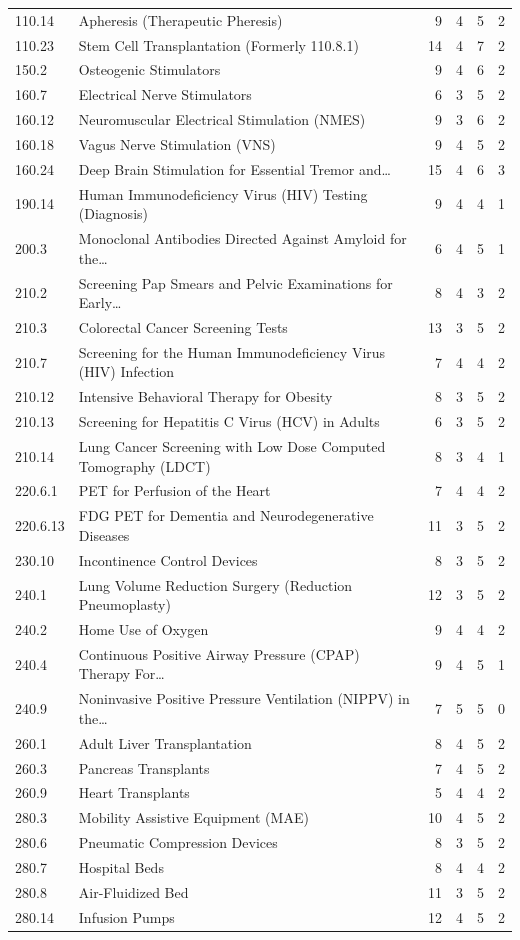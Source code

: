 \documentclass[11pt]{article}
\begin{document}
\begin{longtable}{llrrrr}
110.14 & Apheresis (Therapeutic Pheresis) & 9 & 4 & 5 & 2 \\
110.23 & Stem Cell Transplantation (Formerly 110.8.1) & 14 & 4 & 7 & 2 \\
150.2 & Osteogenic Stimulators & 9 & 4 & 6 & 2 \\
160.7 & Electrical Nerve Stimulators & 6 & 3 & 5 & 2 \\
160.12 & Neuromuscular Electrical Stimulation (NMES) & 9 & 3 & 6 & 2 \\
160.18 & Vagus Nerve Stimulation (VNS) & 9 & 4 & 5 & 2 \\
160.24 & Deep Brain Stimulation for Essential Tremor and\ldots & 15 & 4 & 6 & 3 \\
190.14 & Human Immunodeficiency Virus (HIV) Testing (Diagnosis) & 9 & 4 & 4 & 1 \\
200.3 & Monoclonal Antibodies Directed Against Amyloid for the\ldots & 6 & 4 & 5 & 1 \\
210.2 & Screening Pap Smears and Pelvic Examinations for Early\ldots & 8 & 4 & 3 & 2 \\
210.3 & Colorectal Cancer Screening Tests & 13 & 3 & 5 & 2 \\
210.7 & Screening for the Human Immunodeficiency Virus (HIV) Infection & 7 & 4 & 4 & 2 \\
210.12 & Intensive Behavioral Therapy for Obesity & 8 & 3 & 5 & 2 \\
210.13 & Screening for Hepatitis C Virus (HCV) in Adults & 6 & 3 & 5 & 2 \\
210.14 & Lung Cancer Screening with Low Dose Computed Tomography (LDCT) & 8 & 3 & 4 & 1 \\
220.6.1 & PET for Perfusion of the Heart & 7 & 4 & 4 & 2 \\
220.6.13 & FDG PET for Dementia and Neurodegenerative Diseases & 11 & 3 & 5 & 2 \\
230.10 & Incontinence Control Devices & 8 & 3 & 5 & 2 \\
240.1 & Lung Volume Reduction Surgery (Reduction Pneumoplasty) & 12 & 3 & 5 & 2 \\
240.2 & Home Use of Oxygen & 9 & 4 & 4 & 2 \\
240.4 & Continuous Positive Airway Pressure (CPAP) Therapy For\ldots & 9 & 4 & 5 & 1 \\
240.9 & Noninvasive Positive Pressure Ventilation (NIPPV) in the\ldots & 7 & 5 & 5 & 0 \\
260.1 & Adult Liver Transplantation & 8 & 4 & 5 & 2 \\
260.3 & Pancreas Transplants & 7 & 4 & 5 & 2 \\
260.9 & Heart Transplants & 5 & 4 & 4 & 2 \\
280.3 & Mobility Assistive Equipment (MAE) & 10 & 4 & 5 & 2 \\
280.6 & Pneumatic Compression Devices & 8 & 3 & 5 & 2 \\
280.7 & Hospital Beds & 8 & 4 & 4 & 2 \\
280.8 & Air-Fluidized Bed & 11 & 3 & 5 & 2 \\
280.14 & Infusion Pumps & 12 & 4 & 5 & 2 \\
\bottomrule
\end{longtable}
\normalsize
\end{document}
